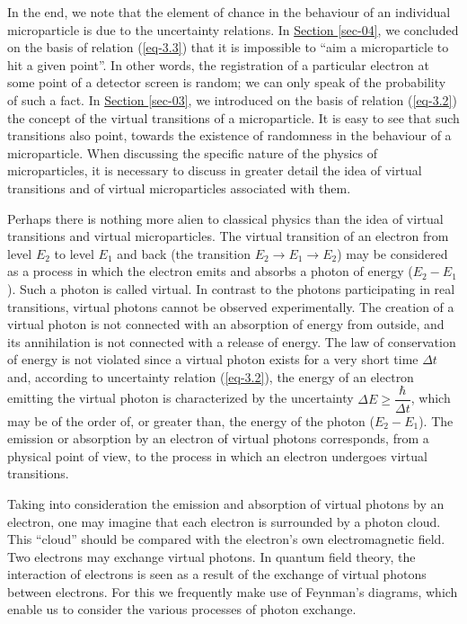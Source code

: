 \documentclass[a4paper,sfsidenotes,colorlinks=true]{tufte-book}
\numberwithin{equation}{section}
\numberwithin{figure}{section}
\begin{document}
In the end, we note that the element of chance in the behaviour of an
individual microparticle is due to the uncertainty relations. In
\hyperref[sec-04]{Section \ref{sec-04}}, we concluded on the basis of
relation (\ref{eq-3.3}) that it is impossible to ``aim a microparticle
to hit a given point''. In other words, the registration of a
particular electron at some point of a detector screen is random; we
can only speak of the probability of such a fact. In
\hyperref[sec-03]{Section \ref{sec-03}}, we introduced on the basis of
relation (\ref{eq-3.2}) the concept of the virtual transitions of a
microparticle. It is easy to see that such transitions also point,
towards the existence of randomness in the behaviour of a
microparticle. When discussing the specific nature of the physics of
microparticles, it is necessary to discuss in greater detail the idea
of virtual transitions and of virtual microparticles associated with
them.


Perhaps 
there is nothing more alien to classical physics than the idea of
virtual transitions and virtual microparticles. The virtual transition
of an electron from level $E_{2}$ to level $E_{1}$ and back (the
transition $E_{2} \to E_{1} \to E_{2}$) may be considered as a process
in which the electron emits and absorbs a photon of energy ($E_{2} -
E_{1}$). Such a photon is called virtual. In contrast to the photons
participating in real transitions, virtual photons cannot be observed
experimentally. The creation of a virtual photon is not connected with
an absorption of energy from outside, and its annihilation is not
connected with a release of energy. The law of conservation of energy
is not violated since a virtual photon exists for a very short time
$\Delta t$ and, according to uncertainty relation (\ref{eq-3.2}), the
energy of an electron emitting the virtual photon is characterized by
the uncertainty $\Delta E \ge \dfrac{\hbar}{\Delta t}$, which may be
of the order of, or greater than, the energy of the photon ($E_{2} -
E_{1}$). The emission or absorption by an electron of virtual photons
corresponds, from a physical point of view, to the process in which an
electron undergoes virtual transitions.

Taking into consideration the emission and absorption of virtual
photons by an electron, one may imagine that each electron is
surrounded by a photon cloud. This ``cloud'' should be compared with the
electron's own electromagnetic field. Two electrons may exchange
virtual photons. In quantum field theory, the interaction of electrons
is seen as a result of the exchange of virtual photons between
electrons. For this we frequently make use of Feynman's diagrams,
which enable us to consider the various processes of photon exchange.
\end{document}
